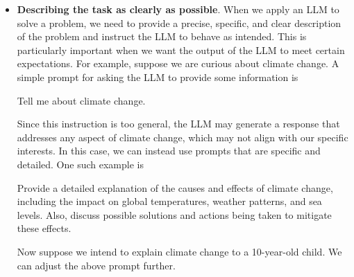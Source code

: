\begin{itemize}
\item \vspace{0.5em} \textbf{Describing the task as clearly as possible}. When we apply an LLM to solve a problem, we need to provide a precise, specific, and clear description of the problem and instruct the LLM to behave as intended. This is particularly important when we want the output of the LLM to meet certain expectations. For example, suppose we are curious about climate change. A simple prompt for asking the LLM to provide some information is

    \vspace{0.5em}
    \begin{tcolorbox}

    \hspace{2em} Tell me about climate change.

    \hspace{2em} \underline{\hspace{2em}}

    \end{tcolorbox}
    \vspace{0.5em}

    Since this instruction is too general, the LLM may generate a response that addresses any aspect of climate change, which may not align with our specific interests. In this case, we can instead use prompts that are specific and detailed. One such example is

    \vspace{0.5em}
    \begin{tcolorbox}

    \begingroup
    \setlength{\leftskip}{2em}
    \setlength{\rightskip}{2em}

    Provide a detailed explanation of the causes and effects of climate change, including the impact on global temperatures, weather patterns, and sea levels. Also, discuss possible solutions and actions being taken to mitigate these effects.

    \underline{\hspace{2em}}

    \endgroup

    \end{tcolorbox}
    \vspace{0.5em}

    Now suppose we intend to explain climate change to a 10-year-old child. We can adjust the above prompt further.


\end{itemize}
